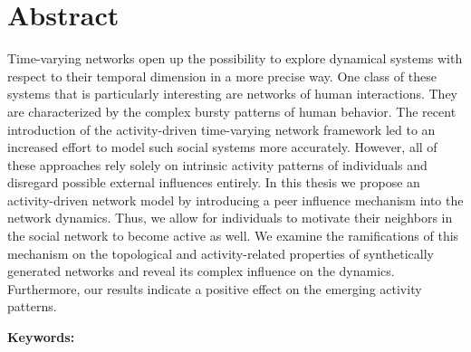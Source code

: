 \chapter*{Abstract}
\label{cha:abstract}

Time-varying networks open up the possibility to explore dynamical systems with respect to their temporal dimension in a more precise way.
One class of these systems that is particularly interesting are networks of human interactions.
They are characterized by the complex bursty patterns of human behavior.
The recent introduction of the activity-driven time-varying network framework led to an increased effort to model such social systems more accurately.
However, all of these approaches rely solely on intrinsic activity patterns of individuals and disregard possible external influences entirely.
In this thesis we propose an activity-driven network model by introducing a peer influence mechanism into the network dynamics.
Thus, we allow for individuals to motivate their neighbors in the social network to become active as well.
We examine the ramifications of this mechanism on the topological and activity-related properties of synthetically generated networks and reveal its complex influence on the dynamics.
Furthermore, our results indicate a positive effect on the emerging activity patterns.


\textbf{Keywords:} \mykeywords{}
